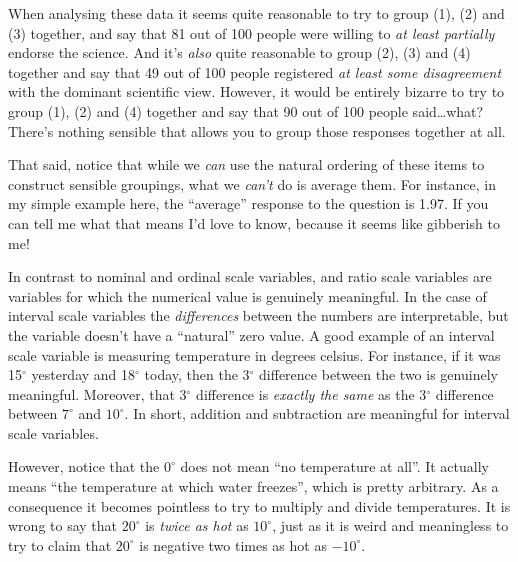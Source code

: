 \noindent
When analysing these data it seems quite reasonable to try to group (1), (2) and (3) together, and say that 81 out of 100 people were willing to {\it at least partially} endorse the science. And it's {\it also} quite reasonable to group (2), (3) and (4) together and say that 49 out of 100 people registered {\it at least some disagreement} with the dominant scientific view. However, it would be entirely bizarre to try to group (1), (2) and (4) together and say that 90 out of 100 people said\ldots what? There's nothing sensible that allows you to group those responses together at all.

That said, notice that while we {\it can} use the natural ordering of these items to construct sensible groupings, what we {\it can't} do is average them. For instance, in my simple example here, the ``average'' response to the question is 1.97. If you can tell me what that means I'd love to know, because it seems like gibberish to me!


In contrast to nominal and ordinal scale variables,  and ratio scale variables are variables for which the numerical value is genuinely meaningful. In the case of interval scale variables the {\it differences} between the numbers are interpretable, but the variable doesn't have a ``natural'' zero value. A good example of an interval scale variable is measuring temperature in degrees celsius. For instance, if it was 15$^\circ$ yesterday and 18$^\circ$ today, then the 3$^\circ$ difference between the two is genuinely meaningful. Moreover, that 3$^\circ$ difference is {\it exactly the same} as the 3$^\circ$ difference between $7^\circ$ and $10^\circ$. In short, addition and subtraction are meaningful for interval scale variables. 

However, notice that the $0^\circ$ does not mean ``no temperature at all''. It actually means ``the temperature at which water freezes'', which is pretty arbitrary. As a consequence it becomes pointless to try to multiply and divide temperatures. It is wrong to say that $20^\circ$ is {\it twice as hot} as $10^\circ$, just as it is weird and meaningless to try to claim that $20^\circ$ is negative two times as hot as $-10^\circ$. 


